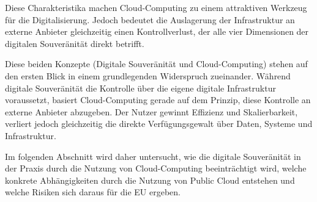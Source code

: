 Diese Charakteristika machen Cloud-Computing zu einem attraktiven Werkzeug für die Digitalisierung. 
Jedoch bedeutet die Auslagerung der Infrastruktur an externe Anbieter gleichzeitig 
einen Kontrollverlust, der alle vier Dimensionen der digitalen Souveränität direkt 
betrifft.

Diese beiden Konzepte (Digitale Souveränität und Cloud-Computing) stehen auf den ersten Blick in einem grundlegenden Widerspruch zueinander. Während digitale Souveränität die Kontrolle über die eigene digitale Infrastruktur voraussetzt, basiert Cloud-Computing gerade auf dem Prinzip, diese Kontrolle an externe Anbieter abzugeben. Der Nutzer gewinnt Effizienz und Skalierbarkeit, verliert jedoch gleichzeitig die direkte Verfügungsgewalt über Daten, Systeme und Infrastruktur.

Im folgenden Abschnitt wird daher untersucht, wie die digitale Souveränität in der Praxis durch die Nutzung von Cloud-Computing beeinträchtigt wird,
welche konkrete Abhängigkeiten durch die Nutzung von Public Cloud entstehen 
und welche Risiken sich daraus für die \ac{EU} ergeben.